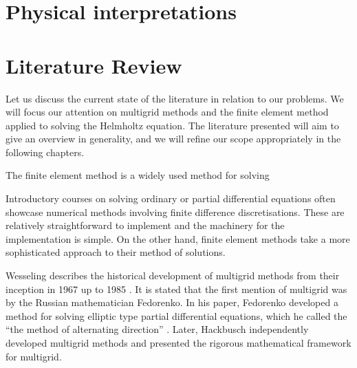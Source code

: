 
\section{Physical interpretations}

\iffalse
	An example of a physical context for the problem
	Underwater
	Seismology
	Acoustics
	In each case:
		What does the solution represent?
		What do the boundary conditions represent?
		What is the state of the field for these applications? E.g. other applications to the same problem.
\fi








\section{Literature Review}

\iffalse

Topics to cover:
	Solving Poisson problem
	Solving Helmholtz
	Complex shifted laplacian
	Multigrid
	Cylindrical coordinates

Mention one or two references for each, try and reach >2 pages.

\fi

Let us discuss the current state of the literature in relation to our problems.
We will focus our attention on multigrid methods and the finite element method applied to solving the Helmholtz equation.
The literature presented will aim to give an overview in generality, and we will refine our scope appropriately in the following chapters.


The finite element method is a widely used method for solving

Introductory courses on solving ordinary or partial differential equations often showcase numerical methods involving finite difference discretisations.
These are relatively straightforward to implement and the machinery for the implementation is simple.
On the other hand, finite element methods take a more sophisticated approach to their method of solutions.


Wesseling describes the historical development of multigrid methods from their inception in 1967 up to 1985 \cite{wesseling}.
It is stated that the first mention of multigrid was by the Russian mathematician Fedorenko.
In his paper, Fedorenko developed a method for solving elliptic type partial differential equations, which he called the ``the method of alternating direction'' \cite{fedorenko}.
Later, Hackbusch independently developed multigrid methods and presented the rigorous mathematical framework for multigrid.

